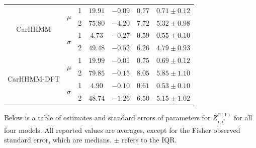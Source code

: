 \documentclass[12pt]{TD-CJS}
\begin{document}
{\begin{tabular}{ccccccc}
\multirow{4}{*}{CarHHMM}   & \multirow{2}{*}{$\mu$}        & 1                             & $19.91$                         & $-0.09$                     & $0.77$                             & $0.71 \pm 0.12$                             \\
                           &                               & 2                             & $75.80$                         & $-4.20$                     & $7.72$                             & $5.32 \pm 0.98$                             \\
                           & \multirow{2}{*}{$\sigma$}     & 1                             & $4.73$                         & $-0.27$                     & $0.59$                             & $0.55 \pm 0.10$                             \\
                           &                               & 2                             & $49.48$                         & $-0.52$                     & $6.26$                             & $4.79 \pm 0.93$                             \\ \hline
\multirow{4}{*}{CarHHMM-DFT}& \multirow{2}{*}{$\mu$}        & 1                             & $19.99$                         & $-0.01$                     & $0.75$                             & $0.69 \pm 0.12$                             \\
                           &                               & 2                             & $79.85$                         & $-0.15$                     & $8.05$                             & $5.85 \pm 1.10$                             \\
                           & \multirow{2}{*}{$\sigma$}     & 1                             & $4.90$                         & $-0.10$                     & $0.61$                             & $0.53 \pm 0.10$                             \\
                           &                               & 2                             & $48.74$                         & $-1.26$                     & $6.50$                             & $5.15 \pm 1.02$                             
\end{tabular}
}

\newpage
Below is a table of estimates and standard errors of parameters for $Z^{*(1)}_{t,t^*}$ for all four models. All reported values are averages, except for the Fisher observed standard error, which are medians. $\pm$ refers to the IQR.
\vspace{1cm}
\end{document}
